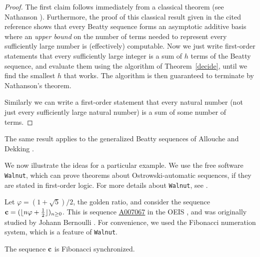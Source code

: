\documentclass[12pt,reqno]{article}
\newcommand{\seqnum}[1]{\href{https://oeis.org/#1}{\rm \underline{#1}}}
\begin{document}
\begin{proof}
The first claim follows immediately from a classical theorem 
(see Nathanson \cite[p.~366, Theorems 11.6 and 11.7]{Nathanson:2000}).  
Furthermore, the proof of this classical result given in the cited
reference shows that every Beatty sequence
forms an asymptotic additive basis where an {\it upper bound\/} on
the number of terms
needed to represent every sufficiently large number is (effectively) computable.
Now we just write first-order statements
that every sufficiently large integer is a sum of $h$ terms of the
Beatty sequence, and evaluate them using the algorithm of Theorem~\ref{decide}, until we find the smallest $h$ that works.  The algorithm
is then guaranteed to terminate by Nathanson's theorem.

Similarly we can write a first-order statement
that every natural number (not just every sufficiently large
natural number) is a sum of some number of terms.
\end{proof}

\begin{remark}
The same result applies to the generalized Beatty sequences of Allouche and Dekking
\cite{Allouche&Dekking:2019}.
\end{remark}

We now illustrate the ideas for a particular example.
We use the free software \texttt{Walnut}, which can prove theorems
about Ostrowski-automatic sequences, if they are stated in first-order
logic.   For more details about \texttt{Walnut}, see
\cite{Mousavi:2016,Shallit:2023}.

Let $\varphi = (1+\sqrt{5})/2$, the golden ratio, and consider the sequence
${\bf c} = (\lfloor n\varphi + {1 \over 2}\rfloor)_{n \geq 0}$.   This is sequence 
\seqnum{A007067} in the OEIS \cite{Sloane:2026}, and was originally studied by Johann Bernoulli \cite[pp.~66--69]{Venkov:1970}.  For convenience, we used
the Fibonacci numeration system, which is a feature of {\tt Walnut}.

\begin{theorem}
The sequence $\bf c$ is Fibonacci synchronized.
\label{varphisynch}
\end{theorem}
\end{document}
